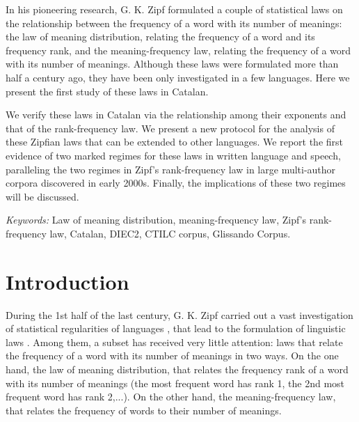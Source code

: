 \documentclass[10pt,letterpaper]{article}
\newif\ifarxiv
\begin{document}
In his pioneering research, G. K. Zipf formulated a couple of statistical laws on the relationship between the frequency of a word with its number of meanings: the law of meaning distribution, relating the frequency of a word and its frequency rank, and the meaning-frequency law, relating the frequency of a word with its number of meanings. Although these laws were formulated more than half a century ago, they have been only investigated in a few languages. Here we present the first study of these laws in Catalan. 

We verify these laws in Catalan via the relationship among their exponents and that of the rank-frequency law. We present a new protocol for the analysis of these Zipfian laws that can be extended to other languages.
We report the first evidence of two marked regimes for these laws in written language and speech, paralleling the two regimes in Zipf's rank-frequency law in large multi-author corpora discovered in early 2000s. Finally, the implications of these two regimes will be discussed.

\textit{Keywords:}
Law of meaning distribution, meaning-frequency law, Zipf's rank-frequency law, Catalan, DIEC2, CTILC corpus, Glissando Corpus.



\ifarxiv
\else
\linenumbers
\fi


\section*{Introduction}
\label{S:1}

During the 1st half of the last century, G. K. Zipf carried out a vast investigation of statistical regularities of languages \cite{zipf1932selected,Zipf1935,Zipf1949}, that lead to the formulation of linguistic laws \cite{RSOS2019}. Among them, a subset has received very little attention: 
laws that relate the frequency of a word with its number of meanings in two ways. On the one hand, the law of meaning distribution, that relates the frequency rank of a word with its number of meanings (the most frequent word has rank 1, the 2nd most frequent word has rank 2,...). On the other hand, the meaning-frequency law, that relates the frequency of words to their number of meanings.
\end{document}
